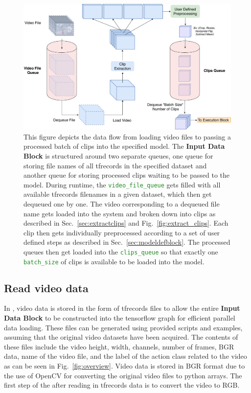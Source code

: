 \documentclass{llncs}
\begin{document}
\begin{figure}[t!]
\centering
\includegraphics[width=1.0\columnwidth]{images/ip_pipeline.pdf}
\caption{This figure depicts the data flow from loading video files to passing a processed batch of clips into the specified model.
The \textbf{Input Data Block} is structured around two separate queues, one queue for storing file names of all tfrecords in the specified dataset and another queue for storing processed clips waiting to be passed to the model.
During runtime, the \texttt{\textcolor{ForestGreen}{video\_file\_queue}} gets filled with all available tfrecords filenames in a given dataset, which then get dequeued one by one.
The video corresponding to a dequeued file name gets loaded into the system and broken down into clips as described in Sec.~\ref{sec:extractclips} and Fig.~\ref{fig:extract_clips}.
Each clip then gets individually preprocessed according to a set of user defined steps as described in Sec.~\ref{sec:modeldefblock}.
The processed queues then get loaded into the \texttt{\textcolor{ForestGreen}{clips\_queue}} so that exactly one \texttt{\textcolor{ForestGreen}{batch\_size}} of clips is available to be loaded into the model.}
\label{fig:ip_block}
\end{figure}


\subsection{Read video data}
\label{sec:readdata}
In \acro, video data is stored in the form of tfrecords files to allow the entire \textbf{Input Data Block} to be constructed into the tensorflow graph for efficient parallel data loading.
These files can be generated using provided scripts and examples, assuming that the original video datasets have been acquired.
The contents of these files include the video height, width, channels, number of frames, BGR data, name of the video file, and the label of the action class related to the video as can be seen in Fig.~\ref{fig:overview}.
Video data is stored in BGR format due to the use of OpenCV for converting the original video files to python arrays.
The first step of the \data after reading in tfrecords data is to convert the video to RGB.
\end{document}
